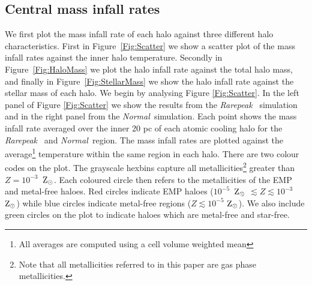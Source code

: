 \documentclass[twocolumn,iop,revtex4]{openjournal}
\newcommand{\zsolar} {$\rm{Z_{\odot}}~$}
\newcommand{\zsolarc} {$\rm{Z_{\odot}}$}
\newcommand{\rarepeak} {\textit{Rarepeak~}}
\newcommand{\normal} {\textit{Normal~}}
\begin{document}

\subsection{Central mass infall rates}

\indent We first plot the mass infall rate of each halo against three different halo
characteristics. First in Figure~\ref{Fig:Scatter} we show a scatter plot of the mass infall rates
against the inner halo temperature. Secondly in Figure~\ref{Fig:HaloMass} we plot the halo infall
rate against the total halo mass, and finally in Figure~\ref{Fig:StellarMass} we show the halo
infall rate against the stellar mass of each halo. We begin by analysing Figure \ref{Fig:Scatter}. 
In the left panel of Figure \ref{Fig:Scatter} we show the results from the \rarepeak
simulation and in the right panel from the \normal simulation. Each point shows the mass
infall rate averaged over the inner 20 pc of each atomic cooling halo for the \rarepeak
and \normal region. The mass infall rates are plotted against the average\footnote{All
  averages are computed using a cell volume weighted mean} temperature within
the same region in each halo. There are two colour codes on the plot. The grayscale
hexbins capture all metallicities\footnote{Note that all metallicities
  referred to in this paper are gas phase metallicities.}
greater than $Z = 10^{-3}$~\zsolarc. Each coloured circle then refers to
the metallicities of the EMP and metal-free haloes. Red circles indicate EMP haloes
 ($10^{-5}$~\zsolar $ \lesssim Z \lesssim 10^{-3}$~\zsolarc)
while blue circles indicate metal-free regions  ($Z \lesssim 10^{-5}$ \zsolarc). We also
include green circles on the plot to indicate haloes which are metal-free and star-free. 
\end{document}
